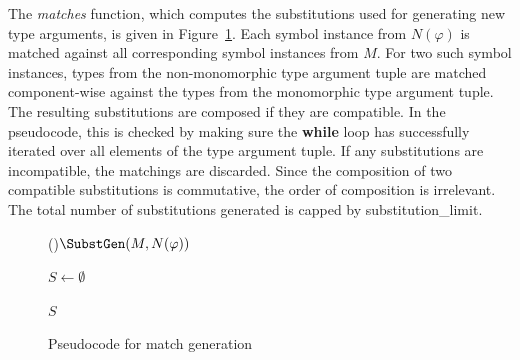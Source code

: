 \documentclass[runningheads]{llncs}
\begin{document}
The \emph{matches} function, which computes the substitutions used for generating new type arguments, is given in Figure~\ref{subst_gen}. Each symbol instance from \(N(\varphi)\) is matched against all corresponding symbol instances from \(M\).
For two such symbol instances, types from the non-monomorphic type argument tuple are matched component-wise against the types from the monomorphic type argument tuple. The resulting substitutions are composed if they are compatible. In the pseudocode, this is checked by making sure the \textbf{while} loop has successfully iterated over all elements of the type argument tuple. If any substitutions are incompatible, the matchings are discarded. Since the composition of two compatible substitutions is commutative, the order of composition is irrelevant. The total number of substitutions generated is capped by \textcolor{ourblueviolet}{substitution\_limit}.

\begin{figure}[t]
\begin{algorithm}[H]
\Fn(){\(\SubstGen(M, N(\varphi))\)}{

   \BlankLine

   \(S\leftarrow \emptyset\)\;

   \BlankLine


   \BlankLine

   \Return \(S\)\;

}
\end{algorithm}
\caption{Pseudocode for match generation}
\label{subst_gen}
\end{figure}
\end{document}
